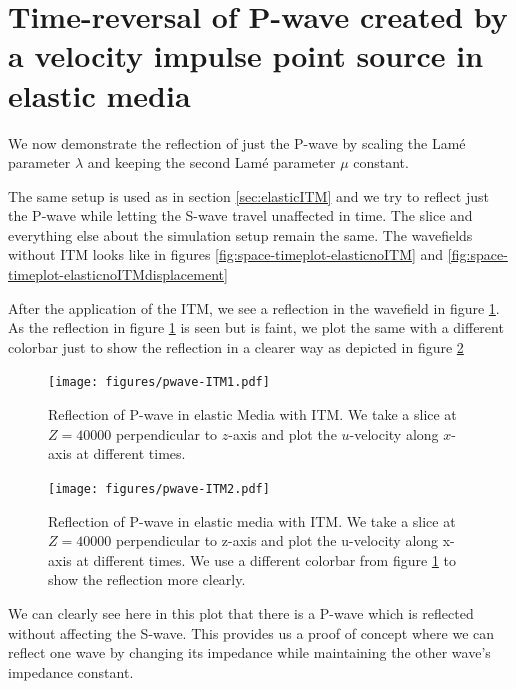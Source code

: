 \section{Time-reversal of P-wave created by a velocity impulse point source in elastic media} \label{sec:elasticITMpwave}
We now demonstrate the reflection of just the P-wave by scaling the Lam\'{e} parameter $\lambda$ and keeping the second Lam\'{e} parameter $\mu$ constant.
\par The same setup is used as in section \ref{sec:elasticITM} and we try to reflect just the P-wave while letting the S-wave travel unaffected in time. The slice
and everything else about the simulation setup remain the same. The wavefields without \ac{ITM} looks like in figures \ref{fig:space-timeplot-elasticnoITM} and
\ref{fig:space-timeplot-elasticnoITMdisplacement}
\par After the application of the \ac{ITM}, we see a reflection in the wavefield in figure \ref{fig:space-timeplot-pwave}.
As the reflection in figure \ref{fig:space-timeplot-pwave} is seen but is faint, we plot the same with a different colorbar just to show the reflection in a clearer
way as depicted in figure \ref{fig:space-timeplot-pwave2}
\begin{figure}[!htpb]
    \centering
    \texttt{[image: figures/pwave-ITM1.pdf]}
    \caption{Reflection of P-wave in elastic Media with \ac{ITM}. We take a slice at $Z=40000$ perpendicular to $z$-axis
    and plot the $u$-velocity along $x$-axis at different times.}
    \label{fig:space-timeplot-pwave}
\end{figure}

\begin{figure}[!htpb] %
    \centering
    \texttt{[image: figures/pwave-ITM2.pdf]}
    \caption{Reflection of P-wave in elastic media with \ac{ITM}. We take a slice at $Z=40000$ perpendicular to z-axis
    and plot the u-velocity along x-axis at different times. We use a different colorbar from figure \ref{fig:space-timeplot-pwave} to show the reflection more clearly.}
    \label{fig:space-timeplot-pwave2}
\end{figure}
\par We can clearly see here in this plot that there is a P-wave which is reflected without affecting the S-wave. This provides us a proof of concept where we 
can reflect one wave by changing its impedance while maintaining the other wave's impedance constant.

